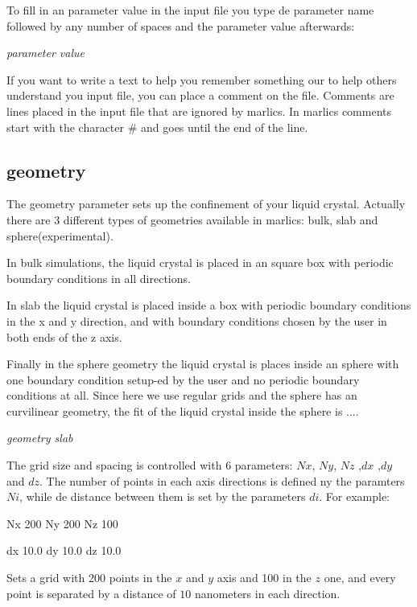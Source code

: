 \documentclass{article}
\newcommand{\consoleline}[2][0.5cm]
{\vspace{#1}
\textit{{#2}}
\vspace{#1}
}
\begin{document}
To fill in an parameter value in the input file you type de parameter name followed by any number of spaces and the parameter value afterwards:

\consoleline{parameter   value}

If you want to write a text to help you remember something our to help others understand you input file, you can place a comment on the file. Comments are lines placed in the input file that are ignored by marlics. In marlics comments start with the character \# and goes until the end of the line.

\subsection{geometry}


The geometry parameter sets up the confinement of your liquid crystal. Actually there are 3 different types of geometries available in marlics: bulk, slab and sphere(experimental).

In bulk simulations, the liquid crystal is placed in an square box with periodic boundary conditions in all directions.

In slab the liquid crystal is placed inside a box with periodic boundary conditions in the x and y direction, and with boundary conditions chosen by the user in both ends of the z axis.

Finally in the sphere geometry the liquid crystal is places inside an sphere with one boundary condition setup-ed by the user and no periodic boundary conditions at all. Since here we use regular grids and the sphere has an curvilinear geometry, the fit of the liquid crystal inside the sphere is ....

\consoleline{geometry  slab}

The grid size and spacing is controlled with 6 parameters: $Nx$, $Ny$, $Nz$ ,$dx$ ,$dy$ and $dz$. The number of points in each axis directions is defined ny the paramters $Ni$, while de distance between them is set by the parameters $di$. For example:

Nx 200             %
Ny 200             %
Nz 100             %


dx        10.0    %
dy        10.0    %
dz        10.0    %

Sets a grid with 200 points in the $x$ and $y$ axis and 100 in the $z$ one, and every point is separated by a distance of $10$ nanometers in each direction.
\end{document}
